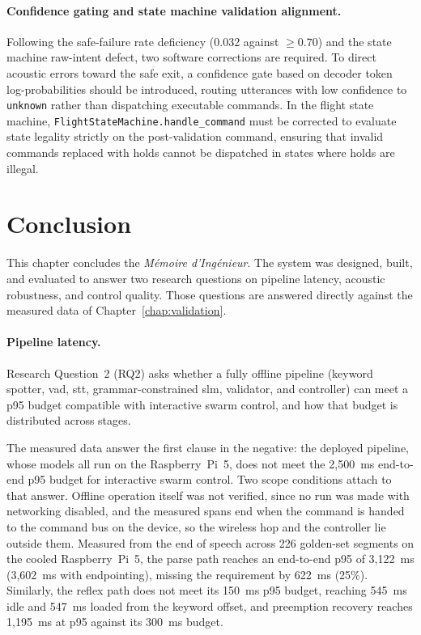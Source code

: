 \paragraph{Confidence gating and state machine validation alignment.} Following the safe-failure rate
deficiency (0.032 against $\geq 0.70$) and the state machine raw-intent defect, two software corrections
are required. To direct acoustic errors toward the safe exit, a confidence gate based on decoder token
log-probabilities should be introduced, routing utterances with low confidence to \texttt{unknown} rather
than dispatching executable commands. In the flight state machine,
\texttt{FlightStateMachine.handle\_command} must be corrected to evaluate state legality strictly on the
post-validation command, ensuring that invalid commands replaced with holds cannot be dispatched in
states where holds are illegal.

\clearpage
\section{Conclusion}
\label{sec:conclusion}
This chapter concludes the \emph{M\'emoire d'Ing\'enieur}. The system was designed, built, and evaluated
to answer two research questions on pipeline latency, acoustic robustness, and control quality. Those
questions are answered directly against the measured data of Chapter~\ref{chap:validation}.

\paragraph{Pipeline latency.} Research Question~2 (RQ2) asks whether a fully offline pipeline
(keyword spotter, \gls{vad}, \gls{stt}, grammar-constrained \gls{slm}, validator, and controller) can
meet a p95 budget compatible with interactive swarm control, and how that budget is distributed across
stages.

The measured data answer the first clause in the negative: the deployed pipeline, whose models all run on the
Raspberry~Pi~5, does not meet the 2{,}500~ms end-to-end p95 budget for interactive swarm control. Two scope
conditions attach to that answer. Offline operation itself was not verified, since no run was made with
networking disabled, and the measured spans end when the command is handed to the command bus on the
device, so the wireless hop and the controller lie outside them. Measured from the end of speech
across 226 golden-set segments on the cooled Raspberry~Pi~5, the parse path reaches an end-to-end p95 of
3{,}122~ms (3{,}602~ms with endpointing), missing the requirement by 622~ms (25\%). Similarly, the reflex
path does not meet its 150~ms p95 budget, reaching 545~ms idle and 547~ms loaded from the keyword offset,
and preemption recovery reaches 1{,}195~ms at p95 against its 300~ms budget.


